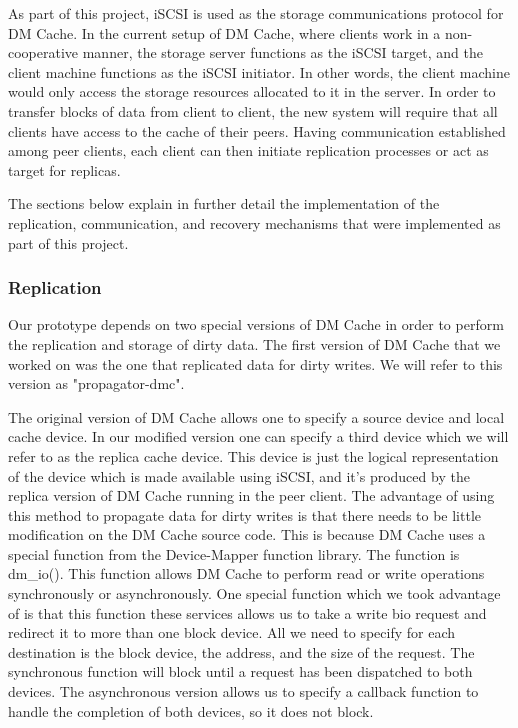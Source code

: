 As part of this project, iSCSI is used as the storage
communications
protocol for DM Cache. In the current setup of DM Cache,
where clients work in a non-cooperative manner, the storage
server functions as the iSCSI target, and the client machine
functions as the iSCSI initiator. In other words, the client
machine would only access the storage resources allocated to
it in the server. In order to transfer blocks of data from
client to client, the new system will require that all
clients have access to the cache of their peers. Having
communication established among peer clients, each client can
then initiate replication processes or act as
target for replicas.

The sections below explain in further detail the implementation
of the replication, communication, and recovery mechanisms
that were implemented as part of this project.

\subsubsection{Replication}
Our prototype depends on two special versions of DM Cache 
in order to perform the replication and storage of dirty data.
The first version of DM Cache that we worked on was the one
that replicated data for dirty writes. We will refer to this 
version as "propagator-dmc".

The original version of DM Cache allows one to specify a source
device and local cache device. In our modified version one
can specify a third device which we will refer to as the replica
cache device. This device is just the logical representation of
the device which is made available using iSCSI, and it's 
produced by the replica version of DM Cache running in the peer
client. The advantage of using this method to propagate data 
for dirty writes is that there needs to be little modification
on the DM Cache source code. This is because DM Cache uses a 
special function from the Device-Mapper function library. The
function is dm\_io(). This function allows DM Cache to perform
read or write operations synchronously or asynchronously. 
One special function which we took advantage of is that this
function these services allows us to take a write bio request and
redirect it to more than one block device. All we need to specify
for each destination is the block device, the address, and the 
size of the request. The synchronous function will block until
a request has  been dispatched to both devices. The asynchronous
version allows us to specify a callback function to handle
the completion of both devices, so it does not block.

